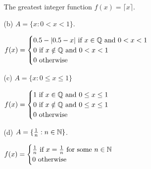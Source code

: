 \documentclass[12pt,letterpaper]{article}
\begin{document}
\begin{itemize}[leftmargin=!,labelindent=5pt]
\begin{itemize}
                    The greatest integer function $f(x) = \lceil x \rceil$.
                \item [(b)] $A = \{x : 0 < x < 1\}$.

                \(
                    f(x) = 
                    \begin{cases}
                        0.5 - \abs{0.5-x} \text{ if } x \in \mathbb{Q} \text{ and } 0 < x < 1\\
                        0 \text{ if } x \notin \mathbb{Q} \text{ and } 0 < x < 1\\
                        0 \text{ otherwise }
                    \end{cases}
                \)
                \item [(c)] $A = \{x : 0 \leq x \leq 1\}$

                \(
                    f(x) = 
                    \begin{cases}
                        1 \text{ if } x \in \mathbb{Q} \text{ and } 0 \leq x \leq 1\\
                        0 \text{ if } x \notin \mathbb{Q} \text{ and } 0 \leq x \leq 1\\
                        0 \text{ otherwise }
                    \end{cases}
                \)
                \item [(d)] $A = \{\frac{1}{n} : n \in \mathbb{N}\}$.
                
                \(
                    f(x) = 
                    \begin{cases}
                        \frac{1}{n} \text{ if } x = \frac{1}{n} \text{ for some } n \in \mathbb{N}\\
                        0 \text{ otherwise }
                    \end{cases}
                \)
            \end{itemize}
    \end{itemize}
\end{document}

